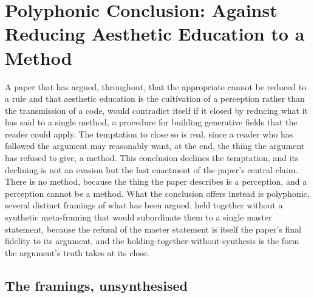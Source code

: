 \section{Polyphonic Conclusion: Against Reducing Aesthetic Education to a Method}
\label{p22:sec:conclusion}

\noindent
A paper that has argued, throughout, that the appropriate cannot be reduced to a rule and that aesthetic education is the cultivation of a perception rather than the transmission of a code, would contradict itself if it closed by reducing what it has said to a single method, a procedure for building generative fields that the reader could apply. The temptation to close so is real, since a reader who has followed the argument may reasonably want, at the end, the thing the argument has refused to give, a method. This conclusion declines the temptation, and its declining is not an evasion but the last enactment of the paper's central claim. There is no method, because the thing the paper describes is a perception, and a perception cannot be a method. What the conclusion offers instead is polyphonic, several distinct framings of what has been argued, held together without a synthetic meta-framing that would subordinate them to a single master statement, because the refusal of the master statement is itself the paper's final fidelity to its argument, and the holding-together-without-synthesis is the form the argument's truth takes at its close.

\subsection{The framings, unsynthesised}
\label{p22:sub:conc-framings}

